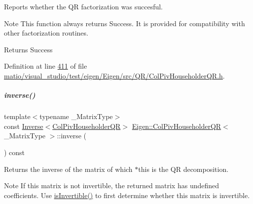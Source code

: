 Reports whether the QR factorization was succesful. 

\begin{DoxyNote}{Note}
This function always returns {\ttfamily Success}. It is provided for compatibility with other factorization routines. 
\end{DoxyNote}
\begin{DoxyReturn}{Returns}
{\ttfamily Success} 
\end{DoxyReturn}


Definition at line \hyperlink{matio_2visual__studio_2test_2eigen_2_eigen_2src_2_q_r_2_col_piv_householder_q_r_8h_source_l00411}{411} of file \hyperlink{matio_2visual__studio_2test_2eigen_2_eigen_2src_2_q_r_2_col_piv_householder_q_r_8h_source}{matio/visual\+\_\+studio/test/eigen/\+Eigen/src/\+Q\+R/\+Col\+Piv\+Householder\+Q\+R.\+h}.

\mbox{\label{group___q_r___module_a31c45402e74774d9cd13af0e57a6b72f}} 
\subparagraph{\texorpdfstring{inverse()}{inverse()}\hspace{0.1cm}{\footnotesize\ttfamily [1/2]}}
{\footnotesize\ttfamily template$<$typename \+\_\+\+Matrix\+Type$>$ \\
const \hyperlink{class_eigen_1_1_inverse}{Inverse}$<$\hyperlink{group___q_r___module_class_eigen_1_1_col_piv_householder_q_r}{Col\+Piv\+Householder\+QR}$>$ \hyperlink{group___q_r___module_class_eigen_1_1_col_piv_householder_q_r}{Eigen\+::\+Col\+Piv\+Householder\+QR}$<$ \+\_\+\+Matrix\+Type $>$\+::inverse (\begin{DoxyParamCaption}{ }\end{DoxyParamCaption}) const\hspace{0.3cm}{\ttfamily [inline]}}

\begin{DoxyReturn}{Returns}
the inverse of the matrix of which $\ast$this is the QR decomposition.
\end{DoxyReturn}
\begin{DoxyNote}{Note}
If this matrix is not invertible, the returned matrix has undefined coefficients. Use \hyperlink{group___q_r___module_a945720f8d683f8ebe97fa807edd3142a}{is\+Invertible()} to first determine whether this matrix is invertible. 
\end{DoxyNote}


